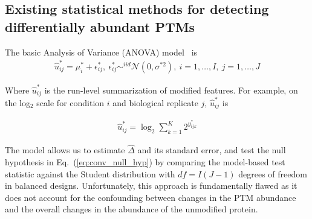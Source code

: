 \documentclass[mcp]{article}
\numberwithin{table}{section}
\def\eqref#1{Eq.~(\ref{eq:#1})}
\begin{document}
\subsection*{Existing statistical methods for detecting differentially abundant PTMs}


\medskip \noindent 

The basic Analysis of Variance (ANOVA) model~\cite{kutner_etal_04a}  is
\begin{eqnarray}
\hat{u}^*_{ij} = \mu^{*}_{i} + \epsilon^{\ast}_{ij}, \ \epsilon^{\ast}_{ij} \mathop\sim^{iid} \mathcal{N}(0, \sigma^{*2}),\ i=1,\ldots,I,\ j=1,\ldots,J
\label{eq:ttest_model}
\end{eqnarray}

Where $\hat{u}^*_{ij}$ is the run-level summarization of modified features. For example, on the log$_2$ scale for condition $i$ and biological replicate $j$, $\hat{u}^*_{ij}$ is

\begin{eqnarray}
\hat{u}^*_{ij} =  \log_2 \sum_{k=1}^{K} 2^{y_{ijk}^{\ast}}
\label{eq:anova_summ}
\end{eqnarray}

The model allows us to estimate $\hat{\Delta}$ and its standard error, and test the null hypothesis in \eqref{conv_null_hyp} by comparing the model-based test statistic against the Student distribution with $df=I(J-1)$ degrees of freedom in balanced designs.
Unfortunately, this approach is fundamentally flawed as it does not account for the confounding between changes in the PTM abundance and the overall changes in the abundance of the unmodified protein.


\end{document}
